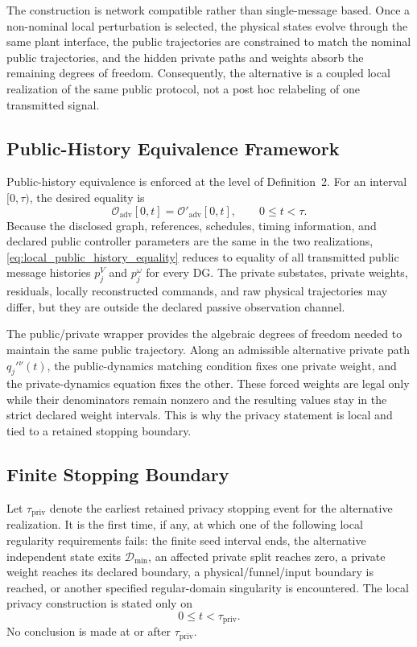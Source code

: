 \documentclass[journal]{IEEEtran}
\begin{document}
The construction is network compatible rather than single-message based. Once a
non-nominal local perturbation is selected, the physical states evolve through
the same plant interface, the public trajectories are constrained to match the
nominal public trajectories, and the hidden private paths and weights absorb the
remaining degrees of freedom. Consequently, the alternative is a coupled local
realization of the same public protocol, not a post hoc relabeling of one
transmitted signal.

\subsection{Public-History Equivalence Framework}

Public-history equivalence is enforced at the level of Definition~2. For an
interval $[0,\tau)$, the desired equality is
\begin{equation}
\mathcal O_{\mathrm{adv}}[0,t]
=\mathcal O'_{\mathrm{adv}}[0,t],
\qquad 0\leq t<\tau.
\label{eq:local_public_history_equality}
\end{equation}
Because the disclosed graph, references, schedules, timing information, and
declared public controller parameters are the same in the two realizations,
\eqref{eq:local_public_history_equality} reduces to equality of all transmitted
public message histories $p_j^V$ and $p_j^\omega$ for every DG. The private
substates, private weights, residuals, locally reconstructed commands, and raw
physical trajectories may differ, but they are outside the declared passive
observation channel.

The public/private wrapper provides the algebraic degrees of freedom needed to
maintain the same public trajectory. Along an admissible alternative private
path $q_j'{}^\nu(t)$, the public-dynamics matching condition fixes one private
weight, and the private-dynamics equation fixes the other. These forced weights
are legal only while their denominators remain nonzero and the resulting values
stay in the strict declared weight intervals. This is why the privacy statement
is local and tied to a retained stopping boundary.

\subsection{Finite Stopping Boundary}

Let $\tau_{\mathrm{priv}}$ denote the earliest retained privacy stopping event
for the alternative realization. It is the first time, if any, at which one of
the following local regularity requirements fails: the finite seed interval
ends, the alternative independent state exits $\mathcal D_{\min}$, an affected
private split reaches zero, a private weight reaches its declared boundary, a
physical/funnel/input boundary is reached, or another specified regular-domain
singularity is encountered. The local privacy construction is stated only on
\begin{equation}
0\leq t<\tau_{\mathrm{priv}}.
\label{eq:privacy_stopping_interval}
\end{equation}
No conclusion is made at or after $\tau_{\mathrm{priv}}$.
\end{document}
